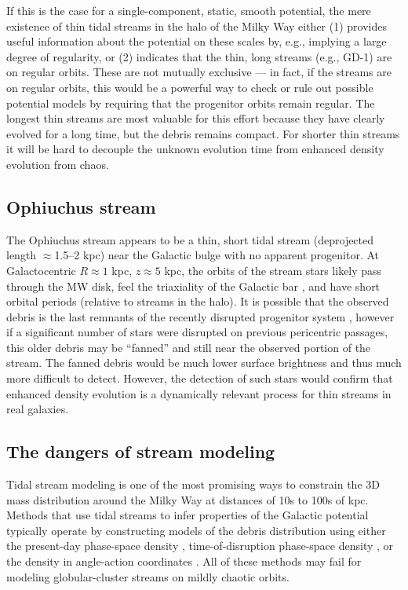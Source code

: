 \documentclass[letterpaper,12pt,preprint]{aastex}
\begin{document}
If this is the case for a single-component, static, smooth potential, the mere existence of thin tidal streams in the halo of the Milky Way either (1) provides useful information about the potential on these scales by, e.g., implying a large degree of regularity, or (2) indicates that the thin, long streams (e.g., GD-1) are on regular orbits. These are not mutually exclusive --- in fact, if the streams are on regular orbits, this would be a powerful way to check or rule out possible potential models by requiring that the progenitor orbits remain regular. The longest thin streams are most valuable for this effort because they have clearly evolved for a long time, but the debris remains compact. For shorter thin streams it will be hard to decouple the unknown evolution time from enhanced density evolution from chaos.

\subsection{Ophiuchus stream}

The Ophiuchus stream \citep{bernard14, sesar15} appears to be a thin, short tidal stream (deprojected length $\approx$1.5--2 kpc) near the Galactic bulge with no apparent progenitor. At Galactocentric $R \approx 1$ kpc, $z \approx 5$ kpc, the orbits of the stream stars likely pass through the MW disk, feel the triaxiality of the Galactic bar \citep[e.g.,][]{wegg13, wegg15}, and have short orbital periods (relative to streams in the halo). It is possible that the observed debris is the last remnants of the recently disrupted progenitor system \citep{sesar15}, however if a significant number of stars were disrupted on previous pericentric passages, this older debris may be ``fanned'' and still near the observed portion of the stream. The fanned debris would be much lower surface brightness and thus much more difficult to detect. However, the detection of such stars would confirm that enhanced density evolution is a dynamically relevant process for thin streams in real galaxies.

\subsection{The dangers of stream modeling}

Tidal stream modeling is one of the most promising ways to constrain the 3D mass distribution around the Milky Way at distances of 10s to 100s of kpc. Methods that use tidal streams to infer properties of the Galactic potential typically operate by constructing models of the debris distribution using either the present-day phase-space density \citep[e.g.,][]{kuepper12, kuepper15}, time-of-disruption phase-space density \citep{apw14}, or the density in angle-action coordinates \citep[e.g.,][]{sanders14, bovy14}. All of these methods may fail for modeling globular-cluster streams on mildly chaotic orbits. 
\end{document}
